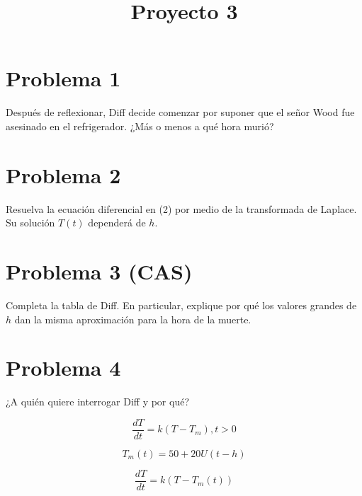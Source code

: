 \documentclass[letter paper, 12pt]{article}
\title{Proyecto 3}
\date{}
\begin{document}
\maketitle
\section*{Problema 1}
Después de reflexionar, Diff decide comenzar por suponer que el señor Wood fue asesinado en el refrigerador. 
¿Más o menos a qué hora murió?
\section*{Problema 2}
Resuelva la ecuación diferencial en (2) por medio de la transformada de Laplace. 
Su solución $T(t)$ dependerá de $h$.
\section*{Problema 3 (CAS)}
Completa la tabla de Diff. En particular, explique por qué los valores grandes de $h$ dan la misma aproximación para la hora de la muerte.
\section*{Problema 4}
¿A quién quiere interrogar Diff y por qué?

\begin{equation}
    \frac{dT}{dt} = k(T - T_m), t > 0
\end{equation}

\begin{equation}
    T_m(t) = 50 + 20  U(t - h)
\end{equation}

\begin{equation}
    \frac{dT}{dt} = k(T - T_m(t))
\end{equation}
\end{document}
